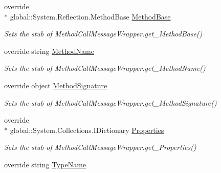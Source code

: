 \begin{DoxyCompactItemize}
override \\*
global\-::\-System.\-Reflection.\-Method\-Base \hyperlink{class_system_1_1_runtime_1_1_remoting_1_1_messaging_1_1_fakes_1_1_stub_method_call_message_wrapper_afd1288c9ccf15140ecf646398ce73e6d}{Method\-Base}
\begin{DoxyCompactList}\small\item\em Sets the stub of Method\-Call\-Message\-Wrapper.\-get\-\_\-\-Method\-Base()\end{DoxyCompactList}\item 
override string \hyperlink{class_system_1_1_runtime_1_1_remoting_1_1_messaging_1_1_fakes_1_1_stub_method_call_message_wrapper_a3f2686af5cfd054bb319d2087ce621fc}{Method\-Name}
\begin{DoxyCompactList}\small\item\em Sets the stub of Method\-Call\-Message\-Wrapper.\-get\-\_\-\-Method\-Name()\end{DoxyCompactList}\item 
override object \hyperlink{class_system_1_1_runtime_1_1_remoting_1_1_messaging_1_1_fakes_1_1_stub_method_call_message_wrapper_ab716af88fe3b6abf515c2c254c03aa45}{Method\-Signature}
\begin{DoxyCompactList}\small\item\em Sets the stub of Method\-Call\-Message\-Wrapper.\-get\-\_\-\-Method\-Signature()\end{DoxyCompactList}\item 
override \\*
global\-::\-System.\-Collections.\-I\-Dictionary \hyperlink{class_system_1_1_runtime_1_1_remoting_1_1_messaging_1_1_fakes_1_1_stub_method_call_message_wrapper_ab8ac3764a971740e952b54b750c69665}{Properties}
\begin{DoxyCompactList}\small\item\em Sets the stub of Method\-Call\-Message\-Wrapper.\-get\-\_\-\-Properties()\end{DoxyCompactList}\item 
override string \hyperlink{class_system_1_1_runtime_1_1_remoting_1_1_messaging_1_1_fakes_1_1_stub_method_call_message_wrapper_a6a7f462be9d5a5c2b8190fb3c20487e4}{Type\-Name}

\end{DoxyCompactItemize}
